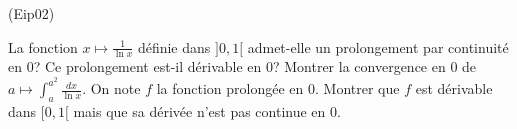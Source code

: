 \begin{tiny}(Eip02)\end{tiny}
La fonction $x\mapsto \frac{1}{\ln x}$ définie dans $]0,1[$ admet-elle un prolongement par continuité en $0$? Ce prolongement est-il dérivable en $0$?\newline
Montrer la convergence en $0$ de $a\mapsto\int_{a}^{a^{2}}\frac{dx}{\ln x}$. On note $f$ la fonction prolongée en $0$. Montrer que $f$ est dérivable dans $[0,1[$ mais que sa dérivée n'est pas continue en $0$. 
